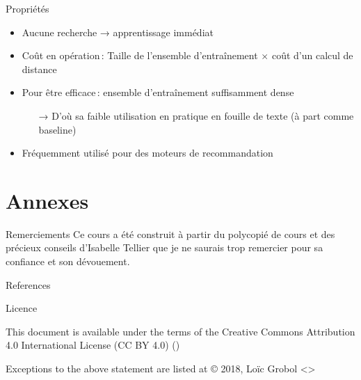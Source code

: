\documentclass[hyperref={unicode}, xcolor={svgnames}, french]{beamer}
\begin{document}
\begin{frame}{Propriétés}
    \begin{itemize}
        \item Aucune recherche → apprentissage immédiat
        \item Coût en opération : Taille de l'ensemble d'entraînement $×$ coût d'un calcul de distance
        \item Pour être efficace : ensemble d'entraînement suffisamment dense
            \begin{itemize}
                \item[→] D'où sa faible utilisation en pratique en fouille de texte (à part comme baseline)
            \end{itemize}
        \item Fréquemment utilisé pour des moteurs de recommandation
    \end{itemize}
\end{frame}


\appendix
{}  %
\section{Annexes}
\begin{frame}{Remerciements}
    Ce cours a été construit à partir du polycopié de cours  \parencite{tellier2017fouille} et des précieux conseils d'Isabelle Tellier que je ne saurais trop remercier pour sa confiance et son dévouement.
\end{frame}

\begin{frame}[allowframebreaks]{References}
    \printbibliography[heading=none]
\end{frame}

\begin{frame}{Licence}
    \begin{center}
        {\huge \ccby}
        \vfill
        This document is available under the terms of the Creative Commons Attribution 4.0 International License (CC BY 4.0) ()

        Exceptions to the above statement are listed at {\small{}}
        \vfill
        © 2018, Loïc Grobol <>

    \end{center}
\end{frame}
\end{document}
